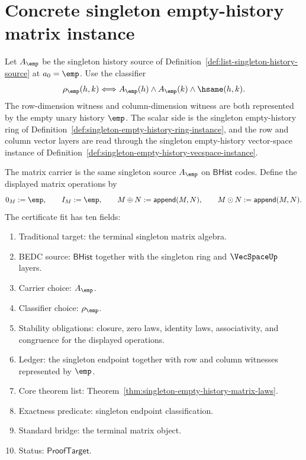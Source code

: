 \section{Concrete singleton empty-history matrix instance}
\label{sec:matrix-concrete-singleton-instance}

\begin{definition}
\label{def:singleton-empty-history-matrix-instance}
Let $A_{\emp}$ be the singleton history source of
Definition~\ref{def:list-singleton-history-source} at $a_0=\emp$. Use the
classifier
$$
\rho_{\emp}(h,k)\Longleftrightarrow
A_{\emp}(h)\land A_{\emp}(k)\land\hsame(h,k).
$$
The row-dimension witness and column-dimension witness are both represented by
the empty unary history $\emp$. The scalar side is the singleton empty-history
ring of Definition~\ref{def:singleton-empty-history-ring-instance}, and the
row and column vector layers are read through the singleton empty-history
vector-space instance of
Definition~\ref{def:singleton-empty-history-vecspace-instance}.

The matrix carrier is the same singleton source $A_{\emp}$ on
$\mathsf{BHist}$ codes. Define the displayed matrix operations by
$$
0_M:=\emp,\qquad I_M:=\emp,\qquad
M\oplus N:=\mathsf{append}(M,N),\qquad
M\odot N:=\mathsf{append}(M,N).
$$
The certificate fit has ten fields:
\begin{enumerate}
  \item Traditional target: the terminal singleton matrix algebra.
  \item BEDC source: $\mathsf{BHist}$ together with the singleton ring and
  $\VecSpaceUp$ layers.
  \item Carrier choice: $A_{\emp}$.
  \item Classifier choice: $\rho_{\emp}$.
  \item Stability obligations: closure, zero laws, identity laws,
  associativity, and congruence for the displayed operations.
  \item Ledger: the singleton endpoint together with row and column witnesses
  represented by $\emp$.
  \item Core theorem list:
  Theorem~\ref{thm:singleton-empty-history-matrix-laws}.
  \item Exactness predicate: singleton endpoint classification.
  \item Standard bridge: the terminal matrix object.
  \item Status: $\mathsf{ProofTarget}$.
\end{enumerate}
\end{definition}

